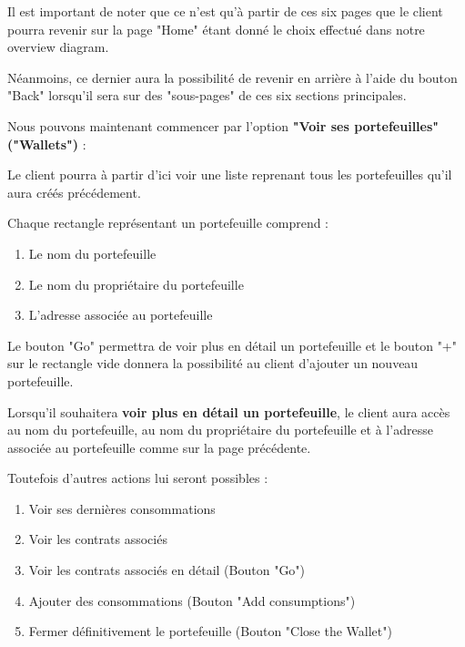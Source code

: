 \begin{flushleft}
Il est important de noter que ce n'est qu'à partir de ces six pages que le client pourra revenir sur la page "Home" étant donné le choix effectué dans notre overview diagram.
\end{flushleft}

\begin{flushleft}
Néanmoins, ce dernier aura la possibilité de revenir en arrière à l'aide du bouton "Back" lorsqu'il sera sur des "sous-pages" de ces six sections principales.
\end{flushleft}

\newpage
\begin{flushleft}
Nous pouvons maintenant commencer par l'option \textbf{"Voir ses portefeuilles" ("Wallets")} :
\end{flushleft}

\begin{flushleft}
Le client pourra à partir d'ici voir une liste reprenant tous les portefeuilles qu'il aura créés précédement. 
\end{flushleft}
\begin{flushleft}
Chaque rectangle représentant un portefeuille comprend :
\end{flushleft}
\begin{enumerate}
\item Le nom du portefeuille
\item Le nom du propriétaire du portefeuille
\item L'adresse associée au portefeuille
\end{enumerate}
\begin{flushleft}
Le bouton "Go" permettra de voir plus en détail un portefeuille et le bouton "+" sur le rectangle vide donnera la possibilité au client d'ajouter un nouveau portefeuille.
\end{flushleft}
\begin{flushleft}

Lorsqu'il souhaitera \textbf{voir plus en détail un portefeuille}, le client aura accès au nom du portefeuille, au nom du propriétaire du portefeuille et à l'adresse associée au portefeuille comme sur la page précédente.
\end{flushleft}
\begin{flushleft}
Toutefois d'autres actions lui seront possibles :
\end{flushleft}
\begin{enumerate}
\item Voir ses dernières consommations
\item Voir les contrats associés
\item Voir les contrats associés en détail (Bouton "Go")
\item Ajouter des consommations (Bouton "Add consumptions")
\item Fermer définitivement le portefeuille (Bouton "Close the Wallet")
\end{enumerate}

